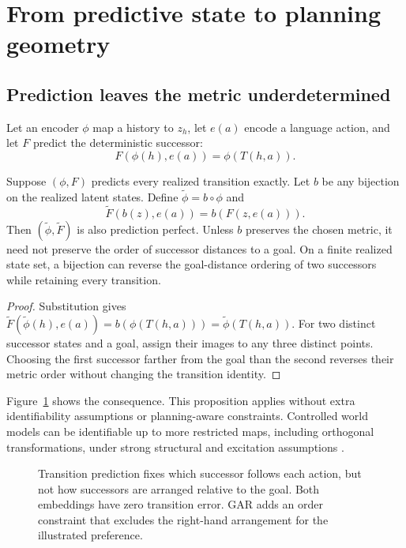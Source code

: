 \section{From predictive state to planning geometry}
\label{sec:method}

\subsection{Prediction leaves the metric underdetermined}

Let an encoder $\phi$ map a history to $z_h$, let $e(a)$ encode a language action, and let $F$ predict the deterministic successor:
\begin{equation}
    F(\phi(h),e(a))=\phi(T(h,a)).
\end{equation}

\begin{proposition}
Suppose $(\phi,F)$ predicts every realized transition exactly. Let $b$ be any bijection on the realized latent states. Define $\widetilde\phi=b\circ\phi$ and
\begin{equation}
    \widetilde F(b(z),e(a))=b(F(z,e(a))).
\end{equation}
Then $(\widetilde\phi,\widetilde F)$ is also prediction perfect. Unless $b$ preserves the chosen metric, it need not preserve the order of successor distances to a goal. On a finite realized state set, a bijection can reverse the goal-distance ordering of two successors while retaining every transition.
\end{proposition}
\begin{proof}
Substitution gives $\widetilde F(\widetilde\phi(h),e(a))=b(\phi(T(h,a)))=\widetilde\phi(T(h,a))$. For two distinct successor states and a goal, assign their images to any three distinct points. Choosing the first successor farther from the goal than the second reverses their metric order without changing the transition identity.
\end{proof}

Figure~\ref{fig:nonidentifiability} shows the consequence. This proposition applies without extra identifiability assumptions or planning-aware constraints. Controlled world models can be identifiable up to more restricted maps, including orthogonal transformations, under strong structural and excitation assumptions \citep{song2026identifiability}.

\begin{figure}[t]
    \centering
    
    \caption{Transition prediction fixes which successor follows each action, but not how successors are arranged relative to the goal. Both embeddings have zero transition error. GAR adds an order constraint that excludes the right-hand arrangement for the illustrated preference.}
    \label{fig:nonidentifiability}
\end{figure}

